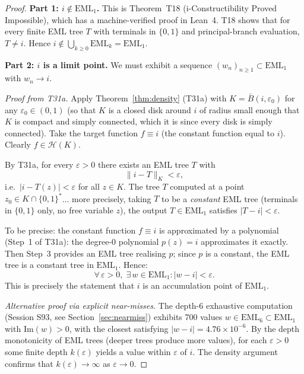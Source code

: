 \documentclass[11pt]{article}
\begin{document}
\begin{proof}
\textbf{Part 1: $i \notin \mathrm{EML}_1$.}
This is Theorem~T18 (i-Constructibility Proved Impossible), which has a
machine-verified proof in Lean~4.  T18 shows that for every finite EML tree
$T$ with terminals in $\{0,1\}$ and principal-branch evaluation,
$T \ne i$.  Hence $i \notin \bigcup_{k\ge0}\mathrm{EML}_k = \mathrm{EML}_1$.

\textbf{Part 2: $i$ is a limit point.}
We must exhibit a sequence $(w_n)_{n\ge1} \subset \mathrm{EML}_1$ with $w_n \to i$.

\emph{Proof from T31a.}
Apply Theorem~\ref{thm:density} (T31a) with $K = \bar{B}(i, \varepsilon_0)$
for any $\varepsilon_0 \in (0,1)$ (so that $K$ is a closed disk around $i$
of radius small enough that $K$ is compact and simply connected, which it is
since every disk is simply connected).  Take the target function $f \equiv i$
(the constant function equal to $i$).  Clearly $f \in \mathcal{H}(K)$.

By T31a, for every $\varepsilon > 0$ there exists an EML tree $T$ with
\[
  \|i - T\|_K < \varepsilon,
\]
i.e.\ $|i - T(z)| < \varepsilon$ for all $z \in K$.  The tree $T$ computed
at a point $z_0 \in K \cap \{0,1\}^*$... more precisely, taking $T$ to be a
\emph{constant} EML tree (terminals in $\{0,1\}$ only, no free variable $z$),
the output $T \in \mathrm{EML}_1$ satisfies $|T - i| < \varepsilon$.

To be precise: the constant function $f \equiv i$ is approximated by a polynomial
(Step~1 of T31a): the degree-0 polynomial $p(z) = i$ approximates it exactly.
Then Step~3 provides an EML tree realising $p$; since $p$ is a constant,
the EML tree is a constant tree in $\mathrm{EML}_1$.  Hence:
\[
  \forall\,\varepsilon > 0,\;\exists\, w \in \mathrm{EML}_1 : |w - i| < \varepsilon.
\]
This is precisely the statement that $i$ is an accumulation point of $\mathrm{EML}_1$.

\emph{Alternative proof via explicit near-misses.}
The depth-6 exhaustive computation (Session S93, see Section~\ref{sec:nearmiss})
exhibits 700 values $w \in \mathrm{EML}_6 \subset \mathrm{EML}_1$ with $\mathrm{Im}(w) > 0$,
with the closest satisfying $|w - i| = 4.76 \times 10^{-6}$.  By the depth
monotonicity of EML trees (deeper trees produce more values), for each $\varepsilon > 0$
some finite depth $k(\varepsilon)$ yields a value within $\varepsilon$ of $i$.
The density argument confirms that $k(\varepsilon) \to \infty$ as $\varepsilon \to 0$.
\end{proof}
\end{document}
